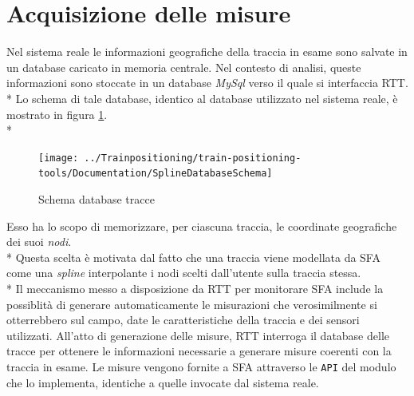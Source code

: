 \section{Acquisizione delle misure}
Nel sistema reale le informazioni geografiche della traccia in esame sono salvate in un database caricato in memoria centrale. Nel contesto di analisi, queste informazioni sono stoccate in un database \emph{MySql} verso il quale si interfaccia RTT.\\*
Lo schema di tale database, identico al database utilizzato nel sistema reale, \`e mostrato in figura \ref{fig:splinedb}.\\*
\begin{figure}[h]
	\centering
	\texttt{[image: ../Trainpositioning/train-positioning-tools/Documentation/SplineDatabaseSchema]}
	\caption{Schema database tracce}
	\label{fig:splinedb}
\end{figure}
Esso ha lo scopo di memorizzare, per ciascuna traccia, le coordinate geografiche dei suoi \emph{nodi}.\\*
Questa scelta \`e motivata dal fatto che una traccia viene modellata da SFA come una \emph{spline} interpolante i nodi scelti dall'utente sulla traccia stessa.\\*
Il meccanismo messo a disposizione da RTT per monitorare SFA include la possiblit\`a di generare automaticamente le misurazioni che verosimilmente si otterrebbero sul campo, date le caratteristiche della traccia e dei sensori utilizzati. All'atto di generazione delle misure, RTT interroga il database delle tracce per ottenere le informazioni necessarie a generare misure coerenti con la traccia in esame. Le misure vengono fornite a SFA attraverso le \texttt{API} del modulo che lo implementa, identiche a quelle invocate dal sistema reale.
